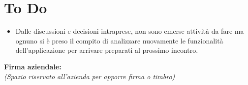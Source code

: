 \documentclass[a4paper,12pt]{article}
\begin{document}
\section{To Do}
\begin{itemize}
    \item Dalle discussioni e decisioni intraprese, non sono emerse attivit\`a da fare ma ognuno si \`e preso il compito di analizzare nuovamente le funzionalit\`a dell'applicazione per arrivare preparati al prossimo incontro.
\end{itemize}

\vspace*{\fill}
\noindent
\begin{minipage}{0.60\textwidth}
    {\small
    \textbf{Firma aziendale:}\\[0.3cm]
    \textit{(Spazio riservato all’azienda per apporre firma o timbro)}\\[0.8cm]
    \fbox{\rule{0pt}{2.5cm}\rule{5cm}{0pt}} 
    }
\end{minipage}
\end{document}
